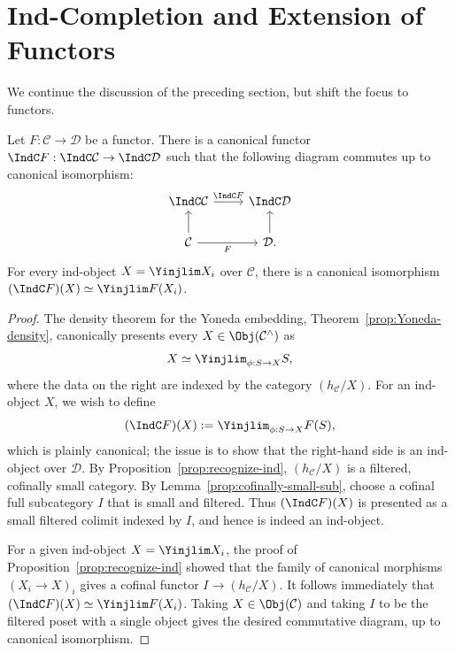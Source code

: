 
\section{Ind-Completion and Extension of Functors}\label{sec:Indization-functor}
We continue the discussion of the preceding section, but shift the focus to functors.

\begin{definition-proposition}\label{def:Ind-functor}
	Let $F:\mathcal{C}\to\mathcal{D}$ be a functor. There is a canonical functor $\IndC F:\IndC\mathcal{C}\to\IndC\mathcal{D}$ such that the following diagram commutes up to canonical isomorphism:
	\[\begin{tikzcd}
		\IndC\mathcal{C} \arrow[r, "{\IndC F}"] & \IndC \mathcal{D} \\
		\mathcal{C} \arrow[u] \arrow[r, "F"'] & \mathcal{D}. \arrow[u]
	\end{tikzcd}\]
	For every ind-object $X=\Yinjlim X_i$ over $\mathcal{C}$, there is a canonical isomorphism $(\IndC F)(X)\simeq\Yinjlim F(X_i)$.
\end{definition-proposition}
\begin{proof}
	The density theorem for the Yoneda embedding, Theorem~\ref{prop:Yoneda-density}, canonically presents every $X\in\Obj(\mathcal{C}^\wedge)$ as
	\[ X \simeq \Yinjlim_{\phi: S \to X} S, \]
	where the data on the right are indexed by the category $(h_{\mathcal{C}}/X)$. For an ind-object $X$, we wish to define
	\[ (\IndC F)(X) := \Yinjlim_{\phi: S \to X} F(S), \]
	which is plainly canonical; the issue is to show that the right-hand side is an ind-object over $\mathcal{D}$. By Proposition~\ref{prop:recognize-ind}, $(h_{\mathcal{C}}/X)$ is a filtered, cofinally small category. By Lemma~\ref{prop:cofinally-small-sub}, choose a cofinal full subcategory $I$ that is small and filtered. Thus $(\IndC F)(X)$ is presented as a small filtered colimit indexed by $I$, and hence is indeed an ind-object.

	For a given ind-object $X=\Yinjlim X_i$, the proof of Proposition~\ref{prop:recognize-ind} showed that the family of canonical morphisms $(X_i\to X)_i$ gives a cofinal functor $I\to(h_{\mathcal{C}}/X)$. It follows immediately that $(\IndC F)(X)\simeq\Yinjlim F(X_i)$. Taking $X\in\Obj(\mathcal{C})$ and taking $I$ to be the filtered poset with a single object gives the desired commutative diagram, up to canonical isomorphism.
\end{proof}


